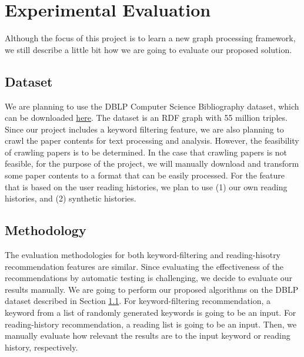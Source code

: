 \section{Experimental Evaluation}
%
Although the focus of this project is to learn a new graph processing framework, we still describe a little bit how we are going to evaluate our proposed solution.
%
\subsection{Dataset} \label{dataset}
%
We are planning to use the DBLP Computer Science Bibliography dataset, which can be downloaded \href{http://www.rdfhdt.org/datasets/}{here}.
%
The dataset is an RDF graph with 55 million triples.
%
Since our project includes a keyword filtering feature, we are also planning to crawl the paper contents for text processing and analysis.
%
However, the feasibility of crawling papers is to be determined.
%
In the case that crawling papers is not feasible, for the purpose of the project, we will manually download and transform some paper contents to a format that can be easily processed.
%
For the feature that is based on the user reading histories, we plan to use (1) our own reading histories, and (2) synthetic histories.
%
\subsection{Methodology}
%
The evaluation methodologies for both keyword-filtering and reading-hisotry recommendation features are similar.
%
Since evaluating the effectiveness of the recommendations by automatic testing is challenging, we decide to evaluate our results manually.
%
We are going to perform our proposed algorithms on the DBLP dataset described in Section \ref{dataset}.
%
For keyword-filtering recommendation, a keyword from a list of randomly generated keywords is going to be an input.
%
For reading-history recommendation, a reading list is going to be an input.
%
Then, we manually evaluate how relevant the results are to the input keyword or reading history, respectively.
%
